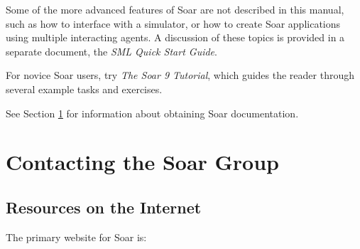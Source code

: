 Some of the more advanced features of Soar are not described in this
manual, such as how to interface with a simulator, or how to create Soar
applications using multiple interacting agents.  A discussion of
these topics is provided in a separate document, the \textit{SML Quick Start Guide}.

For novice Soar users, try \textit{The Soar 9 Tutorial}, which guides the reader 
through several example tasks and exercises.

See Section \ref{CONTACT} for information about obtaining Soar documentation.

%
%
\section{Contacting the Soar Group}
\label{CONTACT}

\subsection*{Resources on the Internet}

The primary website for Soar is:

\hspace{2em}

